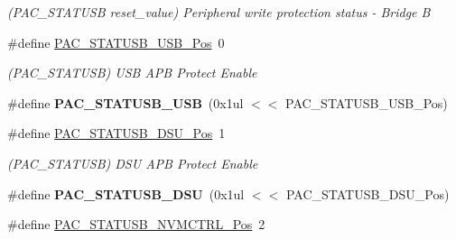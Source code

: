 \begin{DoxyCompactItemize}
\begin{DoxyCompactList}\small\item\em (P\+A\+C\+\_\+\+S\+T\+A\+T\+U\+S\+B reset\+\_\+value) Peripheral write protection status -\/ Bridge B \end{DoxyCompactList}\item 
\hypertarget{group___s_a_m_l21___p_a_c_ga7ce1c5b0369c93a4ea6f8d4c06d08566}{}\#define \hyperlink{group___s_a_m_l21___p_a_c_ga7ce1c5b0369c93a4ea6f8d4c06d08566}{P\+A\+C\+\_\+\+S\+T\+A\+T\+U\+S\+B\+\_\+\+U\+S\+B\+\_\+\+Pos}~0\label{group___s_a_m_l21___p_a_c_ga7ce1c5b0369c93a4ea6f8d4c06d08566}

\begin{DoxyCompactList}\small\item\em (P\+A\+C\+\_\+\+S\+T\+A\+T\+U\+S\+B) U\+S\+B A\+P\+B Protect Enable \end{DoxyCompactList}\item 
\hypertarget{group___s_a_m_l21___p_a_c_ga899b1d957070092834908b5665eb1da1}{}\#define {\bfseries P\+A\+C\+\_\+\+S\+T\+A\+T\+U\+S\+B\+\_\+\+U\+S\+B}~(0x1ul $<$$<$ P\+A\+C\+\_\+\+S\+T\+A\+T\+U\+S\+B\+\_\+\+U\+S\+B\+\_\+\+Pos)\label{group___s_a_m_l21___p_a_c_ga899b1d957070092834908b5665eb1da1}

\item 
\hypertarget{group___s_a_m_l21___p_a_c_gaf88bb5b688043911841541b2af4fb66c}{}\#define \hyperlink{group___s_a_m_l21___p_a_c_gaf88bb5b688043911841541b2af4fb66c}{P\+A\+C\+\_\+\+S\+T\+A\+T\+U\+S\+B\+\_\+\+D\+S\+U\+\_\+\+Pos}~1\label{group___s_a_m_l21___p_a_c_gaf88bb5b688043911841541b2af4fb66c}

\begin{DoxyCompactList}\small\item\em (P\+A\+C\+\_\+\+S\+T\+A\+T\+U\+S\+B) D\+S\+U A\+P\+B Protect Enable \end{DoxyCompactList}\item 
\hypertarget{group___s_a_m_l21___p_a_c_ga72fbd50e90275444d54db3be7e0b4e9d}{}\#define {\bfseries P\+A\+C\+\_\+\+S\+T\+A\+T\+U\+S\+B\+\_\+\+D\+S\+U}~(0x1ul $<$$<$ P\+A\+C\+\_\+\+S\+T\+A\+T\+U\+S\+B\+\_\+\+D\+S\+U\+\_\+\+Pos)\label{group___s_a_m_l21___p_a_c_ga72fbd50e90275444d54db3be7e0b4e9d}

\item 
\hypertarget{group___s_a_m_l21___p_a_c_gae4de2b760c743f5e657e089cf946f643}{}\#define \hyperlink{group___s_a_m_l21___p_a_c_gae4de2b760c743f5e657e089cf946f643}{P\+A\+C\+\_\+\+S\+T\+A\+T\+U\+S\+B\+\_\+\+N\+V\+M\+C\+T\+R\+L\+\_\+\+Pos}~2\label{group___s_a_m_l21___p_a_c_gae4de2b760c743f5e657e089cf946f643}


\end{DoxyCompactItemize}
